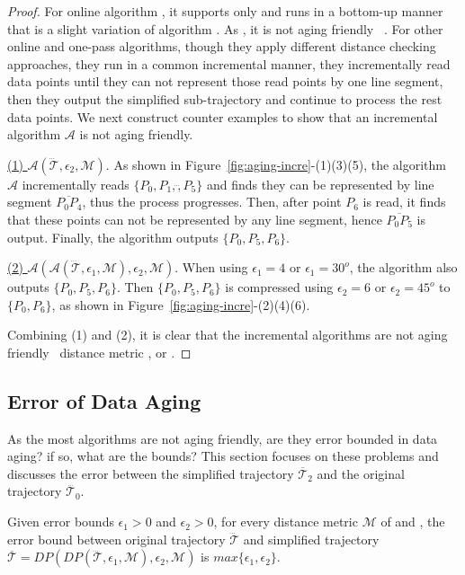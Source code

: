 \begin{proof}
	For online algorithm \squishe, it supports \sed only and runs in a bottom-up manner that is a slight variation of algorithm \tpa. As \tpa, it is not aging friendly \wrt~\sed.
	For other online and one-pass algorithms, though they apply different distance checking approaches, they run in a common incremental manner, \ie they incrementally read data points until they can not represent those read points by one line segment, then they output the simplified sub-trajectory and continue to process the rest data points. We next construct counter examples to show that an incremental algorithm $\mathcal{A}$ is not aging friendly.
	
	\underline{(1) ${\mathcal{A}}(\dddot{\mathcal{T}}, \epsilon_2, \mathcal{M})$}. As shown in Figure~\ref{fig:aging-incre}-(1)(3)(5), the algorithm $\mathcal{A}$ incrementally reads $\{P_0, P_1,\dddot, P_5\}$ and finds they can be represented by line segment $\overline{P_0P_4}$, thus the process progresses. Then, after point $P_6$ is read, it finds that these points can not be represented by any line segment, hence $\overline{P_0P_5}$ is output. Finally, the algorithm outputs $\{P_0, P_5, P_6\}$.
	
	\underline{(2) ${\mathcal{A}}(\mathcal{A}(\dddot{\mathcal{T}}, \epsilon_1, \mathcal{M}), \epsilon_2, \mathcal{M})$}. When using $\epsilon_1=4$ or $\epsilon_1=30^o $, the algorithm also outputs $\{P_0, P_5, P_6\}$. Then $\{P_0, P_5, P_6\}$ is compressed using $\epsilon_2=6$ or $\epsilon_2=45^o$ to $\{P_0, P_6\}$, as shown in Figure~\ref{fig:aging-incre}-(2)(4)(6).
	
	Combining (1) and (2), it is clear that the incremental algorithms are not aging friendly \wrt~distance metric \ped, \sed or \dad.
\end{proof}



\subsection{Error of Data Aging}
As the most algorithms are not aging friendly, are they error bounded in data aging?
if so, what are the bounds?
This section focuses on these problems and discusses the error between the simplified trajectory $\overline{\mathcal{T}}_2$ and the original trajectory $\dddot{\mathcal{T}_0}$.

\begin{proposition}
	\label{theo-aging-error-dp}
	Given error bounds $\epsilon_1>0$ and $\epsilon_2>0$, for every distance metric $\mathcal{M}$ of \ped and \sed, the error bound between original trajectory $\dddot{\mathcal{T}}$ and simplified trajectory $\overline{\mathcal{T}}=DP(DP(\dddot{\mathcal{T}}, \epsilon_1, \mathcal{M}), \epsilon_2, \mathcal{M})$ is $max\{\epsilon_1, \epsilon_2\}$.
\end{proposition}

